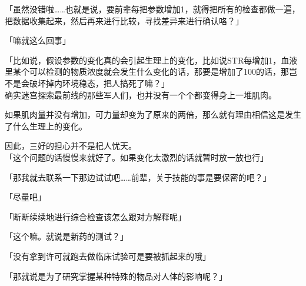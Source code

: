 「虽然没错啦……也就是说，要前辈每把参数增加1，就得把所有的检查都做一遍，把数据收集起来，然后再来进行比较，寻找差异来进行确认咯？」

「嘛就这么回事」

「比如说，假设参数的变化真的会引起生理上的变化，比如说STR每增加1，血液里某个可以检测的物质浓度就会发生什么变化的话，那要是增加了100的话，那岂不是会破坏掉内环境稳态，把人搞死了嘛？」\\

确实迷宫探索最前线的那些军人们，也并没有一个个都变得身上一堆肌肉。

如果肌肉量并没有增加，可力量却变为了原来的两倍，那么就有理由相信这是发生了什么生理上的变化。

因此，三好的担心并不是杞人忧天。\\

「这个问题的话慢慢来就好了。如果变化太激烈的话就暂时放一放也行」

「那我就去联系一下那边试试吧……前辈，关于技能的事是要保密的吧？」

「尽量吧」

「断断续续地进行综合检查该怎么跟对方解释呢」

「这个嘛。就说是新药的测试？」

「没有拿到许可就跑去做临床试验可是要被抓起来的哦」

「那就说是为了研究掌握某种特殊的物品对人体的影响呢？」

